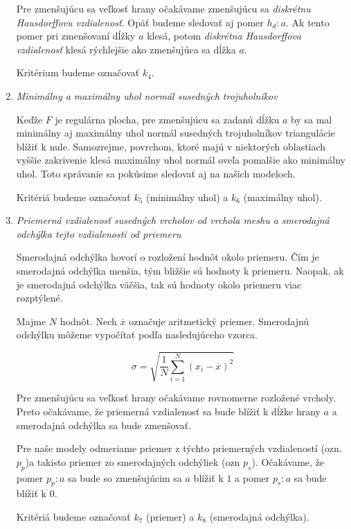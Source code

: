 \begin{enumerate}
{    Pre zmenšujúcu sa veľkosť hrany očakávame zmenšujúcu sa \textit{diskrétnu Hausdorffovu vzdialenosť}.
    Opäť budeme sledovať aj pomer $h_d : a$. Ak tento pomer pri zmenšovaní dĺžky $a$ klesá, potom 
    \textit{diskrétna Hausdorffova vzdialenosť} klesá rýchlejšie ako zmenšujúca sa dĺžka $a$.

    Kritérium budeme označovať $k_4$.
}
\item{
    \textit{Minimálny a maximálny uhol normál susedných trojuholníkov}

    Keďže $F$ je regulárna plocha, pre zmenšujúcu sa zadanú dĺžku $a$ by sa mal minimálny aj maximálny 
    uhol normál susedných trojuholníkov triangulácie blížiť k nule. Samozrejme, povrchom, ktoré majú 
    v niektorých oblastiach vyššie zakrivenie klesá maximálny uhol normál oveľa pomalšie ako minimálny
    uhol. Toto správanie sa pokúsime sledovať aj na našich modeloch.

    Kritériá budeme označovať $k_5$ (minimálny uhol) a $k_6$ (maximálny uhol).
}
\item{
    \textit{Priemerná vzdialenosť susedných vrcholov od vrchola meshu a smerodajná odchýlka tejto vzdialenosti od priemeru}

    Smerodajná odchýlka hovorí o rozložení hodnôt okolo priemeru. Čím je smerodajná odchýlka menšia, 
    tým bližšie sú hodnoty k priemeru. Naopak, ak je smerodajná odchýlka väčšia, tak sú hodnoty okolo
    priemeru viac rozptýlené.
    
    Majme $N$ hodnôt. Nech $\overline{x}$ označuje aritmetický priemer. 
    Smerodajnú odchýlku môžeme vypočítať podľa nasledujúceho vzorca.

    \begin{equation}
    \label{eq:std}
    \sigma = \sqrt{\frac{1}{N} \sum\limits_{i=1}^{N}(x_i - \overline{x})^2} 
    \end{equation}

    Pre zmenšujúcu sa veľkosť hrany očakávame rovnomerne rozložené vrcholy. Preto očakávame, že 
    priemerná vzdialenosť sa bude blížiť k dĺžke hrany $a$ a smerodajná odchýlka sa bude zmenšovať.
    
    Pre naše modely odmeriame priemer z týchto priemerných vzdialeností (ozn. $p_p$)a takisto priemer 
    zo smerodajných odchýliek (ozn $p_s$). Očakávame, že pomer $p_p : a$ sa bude so zmenšujúcim sa $a$
    blížiť k $1$ a pomer $p_s : a$ sa bude blížiť k $0$.

    Kritériá budeme označovať $k_7$ (priemer) a $k_8$ (smerodajná odchýlka).
}
\end{enumerate}

